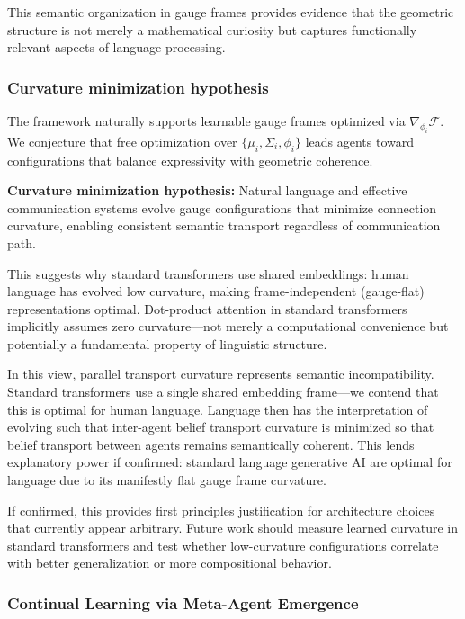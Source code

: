 \documentclass[twoside,11pt]{article}
\begin{document}
This semantic organization in gauge frames provides evidence that the geometric structure is not merely a mathematical curiosity but captures functionally relevant aspects of language processing.

\subsubsection{Curvature minimization hypothesis}

The framework naturally supports learnable gauge frames optimized via $\nabla_{\phi_i} \mathcal{F}$. We conjecture that free optimization over $\{\mu_i, \Sigma_i, \phi_i\}$ leads agents toward configurations that balance expressivity with geometric coherence.

\textbf{Curvature minimization hypothesis:} Natural language and effective communication systems evolve gauge configurations that minimize connection curvature, enabling consistent semantic transport regardless of communication path.

This suggests why standard transformers use shared embeddings: human language has evolved low curvature, making frame-independent (gauge-flat) representations optimal. Dot-product attention in standard transformers implicitly assumes zero curvature---not merely a computational convenience but potentially a fundamental property of linguistic structure.

In this view, parallel transport curvature represents semantic incompatibility. Standard transformers use a single shared embedding frame---we contend that this is optimal for human language. Language then has the interpretation of evolving such that inter-agent belief transport curvature is minimized so that belief transport between agents remains semantically coherent. This lends explanatory power if confirmed: standard language generative AI are optimal for language due to its manifestly flat gauge frame curvature.

If confirmed, this provides first principles justification for architecture choices that currently appear arbitrary. Future work should measure learned curvature in standard transformers and test whether low-curvature configurations correlate with better generalization or more compositional behavior.

\subsubsection{Continual Learning via Meta-Agent Emergence}
\end{document}
